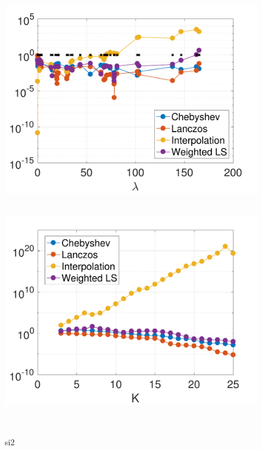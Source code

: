 \documentclass{article}
\begin{document}
\begin{figure}[bth]
\begin{minipage}[m]{0.44\linewidth}
\centerline{~~\includegraphics[width=.95\linewidth]{fig_net25_deg10}}
\end{minipage}
\begin{minipage}[m]{0.44\linewidth}
\centerline{~~\includegraphics[width=.95\linewidth]{fig_net25_err_const_b2}}
\end{minipage}\\
\begin{minipage}[m]{0.1\linewidth}
\centerline{\small{si2}}
\end{minipage}
\begin{minipage}[m]{0.44\linewidth}

\end{minipage}
\end{figure}
\end{document}
